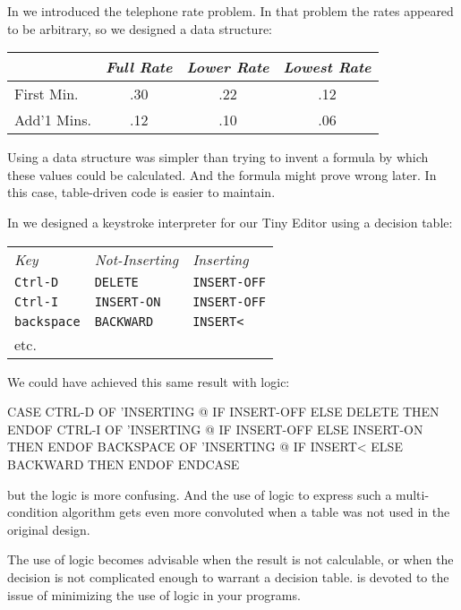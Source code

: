 In  we introduced the telephone rate problem. In that
problem the rates appeared to be arbitrary, so we designed a data
structure:

\bigskip
\begin{tabular}{lccc}
          & \emph{Full Rate} & \emph{Lower Rate} & \emph{Lowest Rate} \\ \hline
First Min.  &       .30        &        .22        &          .12 \\ \hline
Add'1 Mins. &       .12        &        .10        &          .06 \\ \hline
\end{tabular}
\bigskip

\noindent Using a data structure was simpler than trying to invent a
formula by which these values could be calculated. And the formula might
prove wrong later. In this case, table-driven code is easier to maintain.

In  we designed a keystroke interpreter for our Tiny
Editor using a decision table:

\medskip
\begin{tabular}{lll}
\emph{Key}         & \emph{Not-Inserting} & \emph{Inserting} \\
\texttt{Ctrl-D}    & \texttt{DELETE}      & \texttt{INSERT-OFF} \\
\texttt{Ctrl-I}    & \texttt{INSERT-ON}   & \texttt{INSERT-OFF} \\
\texttt{backspace} & \texttt{BACKWARD}    & \texttt{INSERT<} \\
etc. & &
\end{tabular}
\medskip

\medbreak\noindent
We could have achieved this same result with logic:
\begin{Code}
CASE
   CTRL-D     OF  'INSERTING @  IF
      INSERT-OFF   ELSE DELETE     THEN   ENDOF
   CTRL-I     OF  'INSERTING @  IF
      INSERT-OFF   ELSE INSERT-ON  THEN   ENDOF
   BACKSPACE  OF  'INSERTING @  IF
      INSERT<      ELSE BACKWARD   THEN   ENDOF
ENDCASE
\end{Code}
but the logic is more confusing. And the use of logic to express such a
multi-condition algorithm gets even more convoluted when a table was
not used in the original design.

The use of logic becomes advisable when the result is not calculable,
or when the decision is not complicated enough to warrant a decision
table.  is devoted to the issue of minimizing the use of logic
in your programs.

